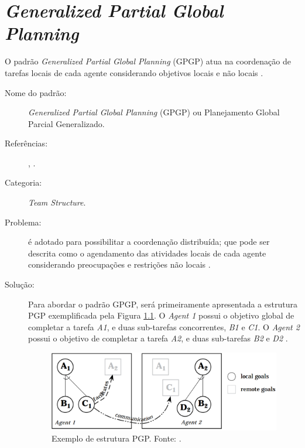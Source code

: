 \chapter{\textit{Generalized Partial Global Planning}}\label{sec:gpgp}

O padrão \textit{Generalized Partial Global Planning} (GPGP) atua na coordenação de tarefas locais de cada agente considerando objetivos locais e não locais \cite{decker1992generalizing}. 


\begin{description}
  \item[Nome do padrão:]  \textit{Generalized Partial Global Planning} (GPGP) ou Planejamento Global Parcial Generalizado.
    \item[Referências:]    , .
    \item[Categoria:] \textit{Team Structure}.
    \item[Problema:] é adotado para possibilitar a coordenação distribuída; que pode ser descrita como o agendamento das atividades locais de cada agente considerando preocupações e restrições não locais \cite{decker1992generalizing}.
    \item[Solução:] Para abordar o padrão GPGP, será primeiramente apresentada a estrutura PGP exemplificada pela Figura \ref{fig:pgp_agent_level}. O \textit{Agent 1} possui o objetivo global de completar a tarefa \textit{A1}, e duas sub-tarefas concorrentes, \textit{B1} e \textit{C1}. O \textit{Agent 2} possui o objetivo de completar a tarefa \textit{A2}, e duas sub-tarefas \textit{B2} e \textit{D2} \cite{decker1992generalizing}. 
    
    
\begin{figure}[h!]
    \centering
    \includegraphics[scale=0.3]{figuras/pgp/pgp_agent_level.png}
    \caption{Exemplo de estrutura PGP. Fonte: .}
    \label{fig:pgp_agent_level}
\end{figure}


\end{description}
